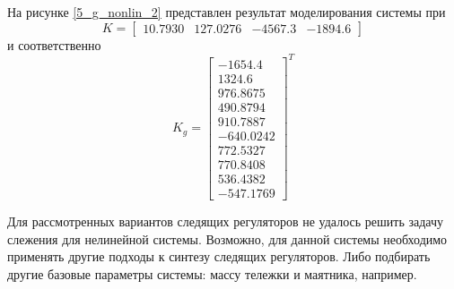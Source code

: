 На рисунке \ref{5_g_nonlin_2} представлен результат моделирования системы при 
\begin{equation}
	K = \begin{bmatrix}
		10.7930& 127.0276& -4567.3 &-1894.6
	\end{bmatrix}
\end{equation}
и соответственно
\begin{equation}
	K_g = \begin{bmatrix}
		-1654.4\\	1324.6\\	976.8675\\	490.8794\\	910.7887\\	-640.0242\\	772.5327\\	770.8408\\	536.4382\\	-547.1769
	\end{bmatrix}^T
\end{equation}


Для рассмотренных вариантов следящих регуляторов не удалось решить задачу слежения для нелинейной системы. Возможно, для данной системы необходимо применять другие подходы к синтезу следящих регуляторов. Либо подбирать другие базовые параметры системы: массу тележки и маятника, например. 

\endinput